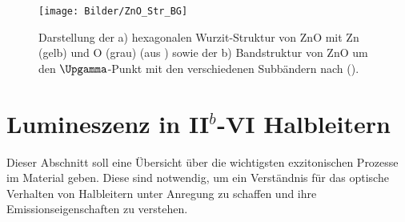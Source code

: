 \begin{figure}[h]
\centering
\texttt{[image: Bilder/ZnO\_Str\_BG]}
\caption[ZnO Kristall- und Bandstruktur]{Darstellung der a) hexagonalen Wurzit-Struktur von ZnO mit Zn (gelb) und O (grau) (aus \cite{wurzite}) sowie der b) Bandstruktur von ZnO um den $\Upgamma$-Punkt mit den verschiedenen Subbändern nach (\cite{Klingshirn.2010}).}
\label{ZnO}
\end{figure}
\section{Lumineszenz in II$^b$-VI Halbleitern}
\label{ExAn}
Dieser Abschnitt soll eine Übersicht über die wichtigsten exzitonischen Prozesse im Material geben. Diese sind notwendig, um ein Verständnis für das optische Verhalten von Halbleitern unter Anregung zu schaffen und ihre Emissionseigenschaften zu verstehen.
